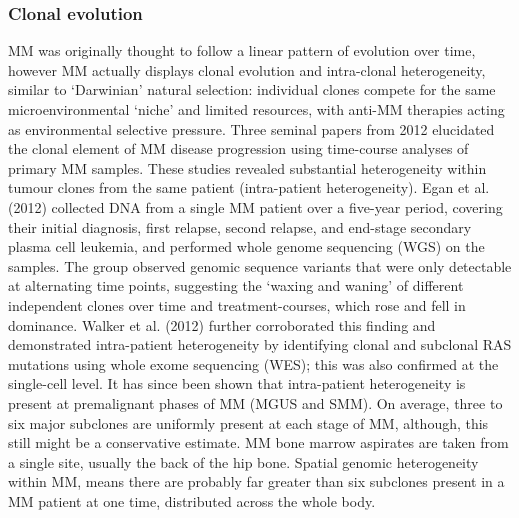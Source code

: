 \subsubsection{Clonal evolution}
MM was originally thought to follow a linear pattern of evolution over time, however MM actually displays clonal evolution and intra-clonal heterogeneity, similar to `Darwinian' natural selection: individual clones compete for the same microenvironmental `niche' and limited resources, with anti-MM therapies acting as environmental selective pressure.
Three seminal papers from 2012 elucidated the clonal element of MM disease progression using time-course analyses of primary MM samples\cite{egan2012whole, keats2012clonal, walker2012intraclonal}.
These studies revealed substantial heterogeneity within tumour clones from the same patient (intra-patient heterogeneity).
Egan et al. (2012) collected DNA from a single MM patient over a five-year period, covering their initial diagnosis, first relapse, second relapse, and end-stage secondary plasma cell leukemia, and performed whole genome sequencing (WGS) on the samples\cite{egan2012whole}.
The group observed genomic sequence variants that were only detectable at alternating time points, suggesting the `waxing and waning' of different independent clones over time and treatment-courses, which rose and fell in dominance\cite{egan2012whole}.
Walker et al. (2012) further corroborated this finding and demonstrated intra-patient heterogeneity by identifying clonal and subclonal RAS mutations using whole exome sequencing (WES); this was also confirmed at the single-cell level\cite{walker2012intraclonal}\@.
It has since been shown that intra-patient heterogeneity is present at premalignant phases of MM (MGUS and SMM)\@.
On average, three to six major subclones are uniformly present at each stage of MM\cite{furukawa2020molecular}, although, this still might be a conservative estimate.
MM bone marrow aspirates are taken from a single site, usually the back of the hip bone.
Spatial genomic heterogeneity within MM, means there are probably far greater than six subclones present in a MM patient at one time, distributed across the whole body\cite{rasche2017spatial}.

